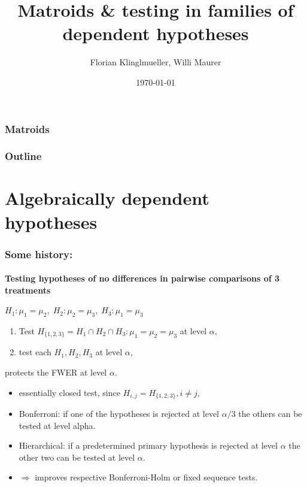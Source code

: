 \documentclass[bigger]{beamer}
\title{Matroids \& testing in families of dependent hypotheses}
\author{Florian Klinglmueller, Willi Maurer}
\date{\today}
\begin{document}
\frametitle{Matroids}

\maketitle



\begin{frame}
\frametitle{Outline}
\setcounter{tocdepth}{3}
\tableofcontents
\end{frame}




\section{Algebraically dependent hypotheses}


\begin{frame}
\frametitle{Some history:}
\framesubtitle{Testing hypotheses of no differences in pairwise
  comparisons of 3 treatments}


\begin{block}{$H_1:\mu_1=\mu_2,\; H_2:\mu_2=\mu_3,\;H_3:\mu_1=\mu_3$}
  \begin{enumerate}
  \item Test $H_ {\{1,2,3\}} = H_1\cap H_2 \cap H_3 :
    \mu_1=\mu_2=\mu_3$ at level $\alpha$,
  \item test each $H_1,H_2,H_3$ at level $\alpha$,
  \end{enumerate}
  protects the FWER at level $\alpha$.
\end{block}
\pause
  \begin{itemize}
    \item  essentially closed test, since %
        $H_{{i,j}} = H_{\{1,2,3\}}, i\neq j,$

    \item  Bonferroni: if one of the hypotheses is rejected at level $\alpha/3$ the others can be tested at level alpha.
    \item  Hierarchical: if a predetermined primary hypothesis is rejected at level $\alpha$ the other two can be tested at level $\alpha$.
    \item  $\Rightarrow$ improves respective Bonferroni-Holm or fixed sequence tests.
  \end{itemize}

\end{frame}
\end{document}
